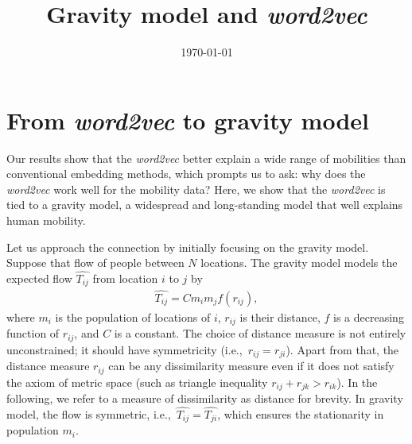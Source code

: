 \documentclass[12pt]{article} %
\def\ie{i.e.,~}
\begin{document}

\title{Gravity model and \textit{\textit{word2vec}}} %
\date{\today}
\maketitle %

\section{From \textit{word2vec} to gravity model}

Our results show that the \textit{word2vec} better explain a wide range of mobilities than conventional embedding methods, which prompts us to ask: why does the \textit{word2vec} work well for the mobility data?
Here, we show that the \textit{word2vec} is tied to a gravity model, a widespread and long-standing model that well explains human mobility.

Let us approach the connection by initially focusing on the gravity model.
Suppose that flow of people between $N$ locations. The gravity model models the expected flow $\hat{T_{ij}}$ from location $i$ to $j$ by
\begin{align}
    \hat{T_{ij}} = C m_i m_j f(r_{ij}), \label{eq:gravity_model}
\end{align}
where $m_i$ is the population of locations of $i$, $r_{ij}$ is their distance, $f$ is a decreasing function of $r_{ij}$, and $C$ is a constant.
The choice of distance measure is not entirely unconstrained; it should have symmetricity (\ie $r_{ij} = r_{ji}$).
Apart from that, the distance measure $r_{ij}$ can be any dissimilarity measure even if it does not satisfy the axiom of metric space (such as triangle inequality $r_{ij}  + r_{jk} > r_{ik}$).
In the following, we refer to a measure of dissimilarity as distance for brevity.
In gravity model, the flow is symmetric, \ie $\hat{T_{ij}}=\hat{T_{ji}}$, which ensures the stationarity in population $m_{i}$.
\end{document}
